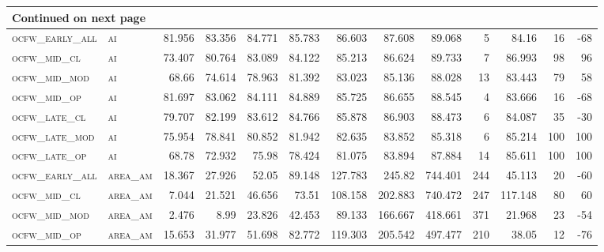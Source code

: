\begin{landscape}
\begin{center}
\begin{footnotesize}
\begin{longtable}{llrrrrrrrr|rrr}
\hline \multicolumn{13}{|l|}{{Continued on next page}} \\ \hline
\endfoot

\hline \hline
\endlastfoot

\textsc{ocfw\_early\_all} & \textsc{ai        }   & 81.956   & 83.356   & 84.771   & 85.783   & 86.603   & 87.608   & 89.068   & 5      & 84.16         & 16            & -68             \\
\textsc{ocfw\_mid\_cl   } & \textsc{ai        }   & 73.407   & 80.764   & 83.089   & 84.122   & 85.213   & 86.624   & 89.733   & 7      & 86.993        & 98            & 96              \\
\textsc{ocfw\_mid\_mod  } & \textsc{ai        }   & 68.66    & 74.614   & 78.963   & 81.392   & 83.023   & 85.136   & 88.028   & 13     & 83.443        & 79            & 58              \\
\textsc{ocfw\_mid\_op   } & \textsc{ai        }   & 81.697   & 83.062   & 84.111   & 84.889   & 85.725   & 86.655   & 88.545   & 4      & 83.666        & 16            & -68             \\
\textsc{ocfw\_late\_cl  } & \textsc{ai        }   & 79.707   & 82.199   & 83.612   & 84.766   & 85.878   & 86.903   & 88.473   & 6      & 84.087        & 35            & -30             \\
\textsc{ocfw\_late\_mod } & \textsc{ai        }   & 75.954   & 78.841   & 80.852   & 81.942   & 82.635   & 83.852   & 85.318   & 6      & 85.214        & 100           & 100             \\
\textsc{ocfw\_late\_op  } & \textsc{ai        }   & 68.78    & 72.932   & 75.98    & 78.424   & 81.075   & 83.894   & 87.884   & 14     & 85.611        & 100           & 100             \\
\textsc{ocfw\_early\_all} & \textsc{area\_am  }   & 18.367   & 27.926   & 52.05    & 89.148   & 127.783  & 245.82   & 744.401  & 244    & 45.113        & 20            & -60             \\
\textsc{ocfw\_mid\_cl   } & \textsc{area\_am  }   & 7.044    & 21.521   & 46.656   & 73.51    & 108.158  & 202.883  & 740.472  & 247    & 117.148       & 80            & 60              \\
\textsc{ocfw\_mid\_mod  } & \textsc{area\_am  }   & 2.476    & 8.99     & 23.826   & 42.453   & 89.133   & 166.667  & 418.661  & 371    & 21.968        & 23            & -54             \\
\textsc{ocfw\_mid\_op   } & \textsc{area\_am  }   & 15.653   & 31.977   & 51.698   & 82.772   & 119.303  & 205.542  & 497.477  & 210    & 38.05         & 12            & -76             \\

\end{longtable}
\end{footnotesize}
\end{center}
\end{landscape}
